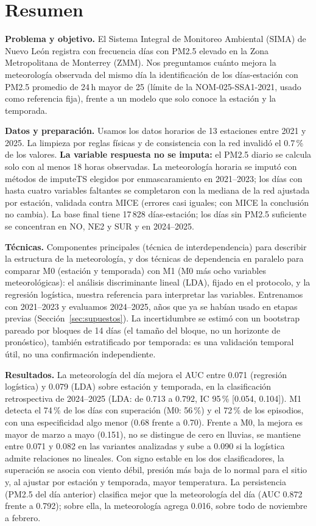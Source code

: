 \section*{Resumen}

\textbf{Problema y objetivo.} El Sistema Integral de Monitoreo Ambiental (SIMA) de Nuevo León registra con frecuencia días con PM2.5 elevado en la Zona Metropolitana de Monterrey (ZMM). Nos preguntamos cuánto mejora la meteorología observada del mismo día la identificación de los días-estación con PM2.5 promedio de 24\,h mayor de 25\ugm{} (límite de la NOM-025-SSA1-2021, usado como referencia fija), frente a un modelo que solo conoce la estación y la temporada.

\textbf{Datos y preparación.} Usamos los datos horarios de 13 estaciones entre 2021 y 2025. La limpieza por reglas físicas y de consistencia con la red invalidó el 0.7\,\% de los valores. \textbf{La variable respuesta no se imputa:} el PM2.5 diario se calcula solo con al menos 18 horas observadas. La meteorología horaria se imputó con métodos de imputeTS elegidos por enmascaramiento en 2021–2023; los días con hasta cuatro variables faltantes se completaron con la mediana de la red ajustada por estación, validada contra MICE (errores casi iguales; con MICE la conclusión no cambia). La base final tiene 17\,828 días-estación; los días sin PM2.5 suficiente se concentran en NO, NE2 y SUR y en 2024–2025.

\textbf{Técnicas.} Componentes principales (técnica de interdependencia) para describir la estructura de la meteorología, y dos técnicas de dependencia en paralelo para comparar M0 (estación y temporada) con M1 (M0 más ocho variables meteorológicas): el análisis discriminante lineal (LDA), fijado en el protocolo, y la regresión logística, nuestra referencia para interpretar las variables. Entrenamos con 2021–2023 y evaluamos 2024–2025, años que ya se habían usado en etapas previas (Sección~\ref{sec:supuestos}). La incertidumbre se estimó con un bootstrap pareado por bloques de 14 días (el tamaño del bloque, no un horizonte de pronóstico), también estratificado por temporada: es una validación temporal útil, no una confirmación independiente.

\textbf{Resultados.} La meteorología del día mejora el AUC entre 0.071 (regresión logística) y 0.079 (LDA) sobre estación y temporada, en la clasificación retrospectiva de 2024–2025 (LDA: de 0.713 a 0.792, IC 95\,\% [0.054, 0.104]). M1 detecta el 74\,\% de los días con superación (M0: 56\,\%) y el 72\,\% de los episodios, con una especificidad algo menor (0.68 frente a 0.70). Frente a M0, la mejora es mayor de marzo a mayo (0.151), no se distingue de cero en lluvias, se mantiene entre 0.071 y 0.082 en las variantes analizadas y sube a 0.090 si la logística admite relaciones no lineales. Con signo estable en los dos clasificadores, la superación se asocia con viento débil, presión más baja de lo normal para el sitio y, al ajustar por estación y temporada, mayor temperatura. La persistencia (PM2.5 del día anterior) clasifica mejor que la meteorología del día (AUC 0.872 frente a 0.792); sobre ella, la meteorología agrega 0.016, sobre todo de noviembre a febrero.

